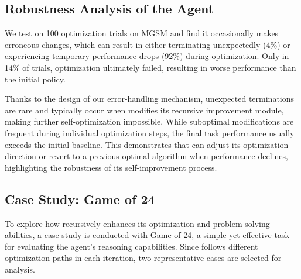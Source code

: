 


\subsection{Robustness Analysis of the Agent}

We test \framework on 100 optimization trials on MGSM and find it occasionally makes erroneous changes, which can result in either terminating unexpectedly (4\%) or experiencing temporary performance drops (92\%) during optimization. Only in 14\% of trials, optimization ultimately failed, resulting in worse performance than the initial policy. 

Thanks to the design of our error-handling mechanism, unexpected terminations are rare and typically occur when \framework modifies its recursive improvement module, making further self-optimization impossible. While suboptimal modifications are frequent during individual optimization steps, the final task performance usually exceeds the initial baseline. This demonstrates that \framework can adjust its optimization direction or revert to a previous optimal algorithm when performance declines, highlighting the robustness of its self-improvement process.



\subsection{Case Study: Game of 24}
\label{sec:game24}
To explore how \framework recursively enhances its optimization and problem-solving abilities, a case study is conducted with Game of 24, a simple yet effective task for evaluating the agent’s reasoning capabilities. Since \framework follows different optimization paths in each iteration, two representative cases are selected for analysis.




